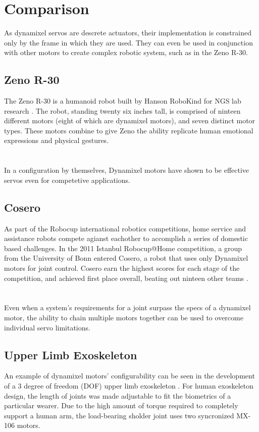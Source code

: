 \documentclass[10pt,journal]{IEEEtran}
\begin{document}
\section{Comparison}
As dynamixel servos are descrete actuators, their implementation is constrained only by the frame in which they are used. They can even be used in conjunction with other motors to create complex robotic system, such as in the Zeno R-30.

\subsection{Zeno R-30}
The Zeno R-30 is a humanoid robot built by Hanson RoboKind for NGS lab research \cite{wijayasinghe2016human}. The robot, standing twenty six inches tall, is comprised of ninteen different motors (eight of which are dynamixel motors), and seven distinct motor types. These motors combine to give Zeno the ability replicate human emotional expressions and physical gestures.
\section*{}
In a configuration by themselves, Dynamixel motors have shown to be effective servos even for competetive applications.

\subsection{Cosero}
As part of the Robocup international robotics competitions, home service and assistance robots compete agianst eachother to accomplish a series of domestic based challenges. In the 2011 Istanbul Robocup@Home competition, a group from the University of Bonn entered Cosero, a robot that uses only Dynamixel motors for joint control. Cosero earn the highest scores for each stage of the competition, and achieved first place overall, beating out ninteen other teams \cite{stuckler2012robocup}.

\section*{}
Even when a system's requirements for a joint surpass the specs of a dynamixel motor, the ability to chain multiple motors together can be used to overcome individual servo limitations.

\subsection{Upper Limb Exoskeleton}
An example of dynamixel motors' configurability can be seen in the development of a 3 degree of freedom (DOF) upper limb exoskeleton \cite{mahdavian2015design}. For human exoskeleton design, the length of joints was made adjustable to fit the biometrics of a particular wearer. Due to the high amount of torque required to completely support a human arm, the load-bearing sholder joint uses two syncronized MX-106 motors.
\end{document}

